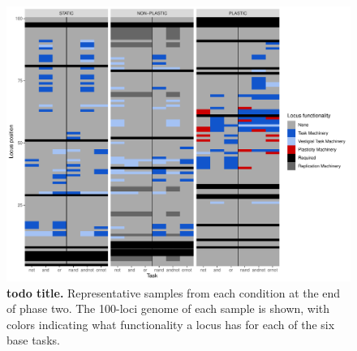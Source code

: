 \begin{figure}[h!]
    \centering
    \includegraphics[width=1\textwidth]{media/locus_slice_combined.pdf}
    \caption{\small
    \textbf{todo title.}
    Representative samples from each condition at the end of phase two. 
    The 100-loci genome of each sample is shown, with colors indicating what functionality a locus has for each of the six base tasks. 
    }
    \label{fig:architecture_locus_functionality}
\end{figure}